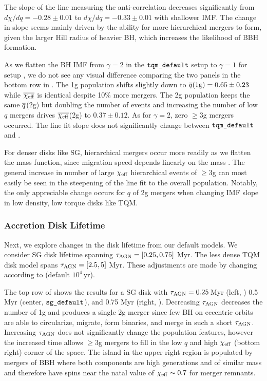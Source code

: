 The slope of the line measuring the anti-correlation decreases significantly from $d\chi/dq=-0.28\pm0.01$ to $d\chi/dq=-0.33\pm0.01$ with shallower IMF.
The change in slope seems mainly driven by the ability for more hierarchical mergers to form, given the larger Hill radius of heavier BH, which increases the likelihood of BBH formation.

As we flatten the BH IMF from $\gamma=2$ in the $\tqmdefault$ setup to $\gamma=1$ for setup , we do not see any visual difference comparing the two panels in the bottom row in .
The 1g population shifts slightly down to $\overline{q}({\rm 1g})=0.65\pm0.23$ while $\overline{\chi_{\rm eff}}$ is identical despite 10\% more mergers.
The 2g population keeps the same $\overline{q}$(2g) but doubling the number of events and increasing the number of low $q$ mergers drives $\overline{\chi_{\rm eff}}$(2g) to $0.37\pm0.12$.
As for $\gamma=2$, zero $\geq$3g mergers occurred.
The line fit slope does not significantly change between $\tqmdefault$ and .

For denser disks like SG, hierarchical mergers occur more readily as we flatten the mass function, since migration speed depends linearly on the mass \citep{McKernan+25-mcfactsI}.
The general increase in number of large $\chi_{\rm eff}$ hierarchical events of $\geq$3g can most easily be seen in the steepening of the line fit to the overall population.
Notably, the only appreciable change occurs for $q$ of 2g mergers when changing IMF slope in low density, low torque disks like TQM.


\subsubsection{Accretion Disk Lifetime}
Next, we explore changes in the disk lifetime from our default models.
We consider SG disk lifetime spanning $\tau_{\rm AGN}=[0.25,0.75]$ Myr.
The less dense TQM disk model spans $\tau_{\rm AGN}=[2.5,5]$ Myr.
These adjustments are made by changing  according to  (default $10^4\,$yr).

The top row of  shows the results for a SG disk with $\tau_{\rm AGN}=0.25\,$Myr (left, ) 0.5 Myr (center, $\sgdefault$), and 0.75 Myr (right, ).
Decreasing $\tau_{\rm AGN}$ decreases the number of 1g and produces a single 2g merger since few BH on eccentric orbits are able to circularize, migrate, form binaries, and merge in such a short $\tau_{\rm AGN}$.
Increasing $\tau_{\rm AGN}$ does not significantly change the population features, however the increased time allows $\geq$3g mergers to fill in the low $q$ and high $\chi_{\rm eff}$ (bottom right) corner of the space.
The island in the upper right region is populated by mergers of BBH where both components are high generations and of similar mass and therefore have spins near the natal value of $\chi_{\rm eff} \sim 0.7$ for merger remnants.

